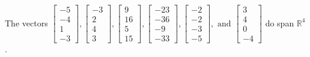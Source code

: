 \begin{exercise}
\begin{exerciseStatement}
  \end{exerciseStatement}
  \begin{exerciseAnswer}
   The vectors \(\left[\begin{array}{r}
-5 \\
-4 \\
1 \\
-3
\end{array}\right] , \left[\begin{array}{r}
-3 \\
2 \\
4 \\
3
\end{array}\right] , \left[\begin{array}{r}
9 \\
16 \\
5 \\
15
\end{array}\right] , \left[\begin{array}{r}
-23 \\
-36 \\
-9 \\
-33
\end{array}\right] , \left[\begin{array}{r}
-2 \\
-2 \\
-3 \\
-5
\end{array}\right] , \text{ and } \left[\begin{array}{r}
3 \\
4 \\
0 \\
-4
\end{array}\right]\) 
  	 do  
	span \(\mathbb{R}^4\).
  


  \end{exerciseAnswer}
\end{exercise}